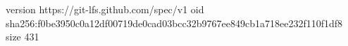 version https://git-lfs.github.com/spec/v1
oid sha256:f0be3950c0a12df00719de0cad03bcc32b9767ee849cb1a718ee232f110f1df8
size 431
